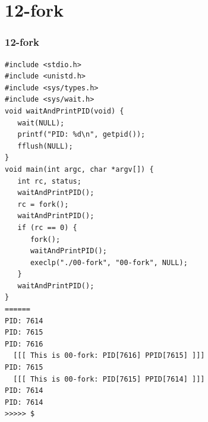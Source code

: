 \documentclass[aspectratio=169, xcolor=table, notheorems, hyperref={pdfpagelabels=false}]{beamer}
\begin{document}
\section{12-fork}
\begin{frame}[fragile]
\frametitle{12-fork}
\begin{lstlisting}[basicstyle=\ttfamily\tiny]
#include <stdio.h>
#include <unistd.h>
#include <sys/types.h>
#include <sys/wait.h>
void waitAndPrintPID(void) {
   wait(NULL);
   printf("PID: %d\n", getpid());
   fflush(NULL);
}
void main(int argc, char *argv[]) {
   int rc, status;
   waitAndPrintPID();
   rc = fork();
   waitAndPrintPID();
   if (rc == 0) {
      fork();
      waitAndPrintPID();
      execlp("./00-fork", "00-fork", NULL);
   }
   waitAndPrintPID();
}
======
PID: 7614
PID: 7615
PID: 7616
  [[[ This is 00-fork: PID[7616] PPID[7615] ]]]
PID: 7615
  [[[ This is 00-fork: PID[7615] PPID[7614] ]]]
PID: 7614
PID: 7614
>>>>> $ 

\end{lstlisting}
\end{frame}

\end{document}
